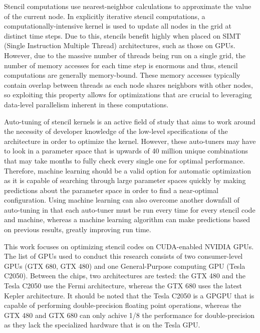\documentclass[conference]{IEEEtran}
\begin{document}
	Stencil computations use nearest-neighbor calculations to approximate the value of the current node. In explicitly iterative stencil computations, a computationally-intensive kernel is used to update all nodes in the grid at distinct time steps. Due to this, stencils benefit highly when placed on SIMT (Single Instruction Multiple Thread) architectures, such as those on GPUs. However, due to the massive number of threads being run on a single grid, the number of memory accesses for each time step is enormous and thus, stencil computations are generally memory-bound. These memory accesses typically contain overlap between threads as each node shares neighbors with other nodes, so exploiting this property allows for optimizations that are crucial to leveraging data-level parallelism inherent in these computations\cite{Zhang}.


	Auto-tuning of stencil kernels is an active field of study that aims to work around the necessity of developer knowledge of the low-level specifications of the architecture in order to optimize the kernel. However, these auto-tuners may have to look in a parameter space that is upwards of 40 million unique combinations that may take months to fully check every single one for optimal performance\cite{Datta}. Therefore, machine learning should be a valid option for automatic optimization as it is capable of searching through large parameter spaces quickly by making predictions about the parameter space in order to find a near-optimal configuration. Using machine learning can also overcome another downfall of auto-tuning in that each auto-tuner must be run every time for every stencil code and machine, whereas a machine learning algorithm can make predictions based on previous results, greatly improving run time.

	This work focuses on optimizing stencil codes on CUDA-enabled NVIDIA GPUs. The list of GPUs used to conduct this research consists of two consumer-level GPUs (GTX 680, GTX 480) and one General-Purpose computing GPU (Tesla C2050). Between the chips, two architectures are tested: the GTX 480 and the Tesla C2050 use the Fermi architecture, whereas the GTX 680 uses the latest Kepler architecture. It should be noted that the Tesla C2050 is a GPGPU that is capable of performing double-precision floating point operations, whereas the GTX 480 and GTX 680 can only achive 1/8 the performance for double-precision as they lack the specialized hardware that is on the Tesla GPU\cite{NVIDIA}. 
\end{document}

